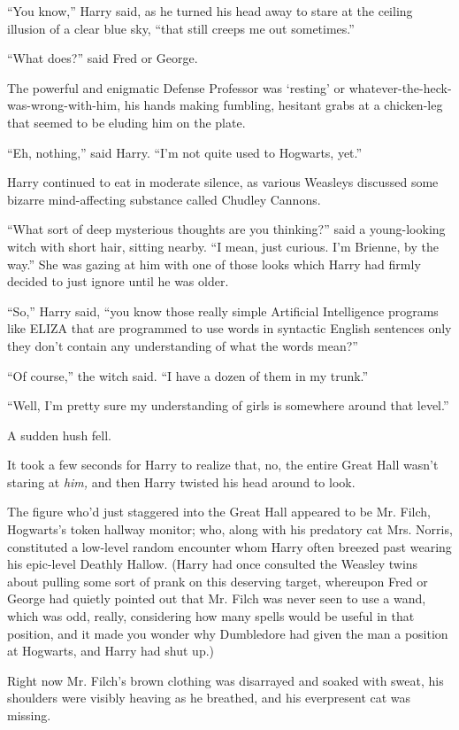``You know,'' Harry said, as he turned his head away to stare at the
ceiling illusion of a clear blue sky, ``that still creeps me out
sometimes.''

``What does?'' said Fred or George.

The powerful and enigmatic Defense Professor was `resting' or
whatever-the-heck-was-wrong-with-him, his hands making fumbling,
hesitant grabs at a chicken-leg that seemed to be eluding him on the
plate.

``Eh, nothing,'' said Harry. ``I'm not quite used to Hogwarts, yet.''

Harry continued to eat in moderate silence, as various Weasleys
discussed some bizarre mind-affecting substance called Chudley Cannons.

``What sort of deep mysterious thoughts are you thinking?'' said a
young-looking witch with short hair, sitting nearby. ``I mean, just
curious. I'm Brienne, by the way.'' She was gazing at him with one of
those looks which Harry had firmly decided to just ignore until he was
older.

``So,'' Harry said, ``you know those really simple Artificial
Intelligence programs like ELIZA that are programmed to use words in
syntactic English sentences only they don't contain any understanding of
what the words mean?''

``Of course,'' the witch said. ``I have a dozen of them in my trunk.''

``Well, I'm pretty sure my understanding of girls is somewhere around
that level.''

A sudden hush fell.

It took a few seconds for Harry to realize that, no, the entire Great
Hall wasn't staring at \emph{him,} and then Harry twisted his head
around to look.

The figure who'd just staggered into the Great Hall appeared to be Mr.
Filch, Hogwarts's token hallway monitor; who, along with his predatory
cat Mrs. Norris, constituted a low-level random encounter whom Harry
often breezed past wearing his epic-level Deathly Hallow. (Harry had
once consulted the Weasley twins about pulling some sort of prank on
this deserving target, whereupon Fred or George had quietly pointed out
that Mr. Filch was never seen to use a wand, which was odd, really,
considering how many spells would be useful in that position, and it
made you wonder why Dumbledore had given the man a position at Hogwarts,
and Harry had shut up.)

Right now Mr. Filch's brown clothing was disarrayed and soaked with
sweat, his shoulders were visibly heaving as he breathed, and his
everpresent cat was missing.

